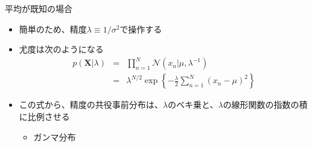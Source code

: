 \begin{frame}{平均が既知の場合}
 \begin{itemize}
  \item 簡単のため、精度$\lambda\equiv 1/\sigma^2$で操作する
  \item 尤度は次のようになる
        \begin{eqnarray}
         p(\bm{X}|\lambda) &=& \prod_{n=1}^{N}\mathcal{N}(x_n|\mu,\lambda^{-1}) \nonumber \\
         &=& \lambda^{N/2}\exp\left\{-\frac{\lambda}{2}\sum_{n=1}^{N}(x_n-\mu)^2\right\}\label{114403_19Nov14}
        \end{eqnarray}
  \item この式から、精度の共役事前分布は、$\lambda$のベキ乗と、$\lambda$の線形関数の指数の積に比例させる
        \begin{itemize}
         \item \alert{ガンマ分布}
        \end{itemize}
 \end{itemize}
\end{frame}


